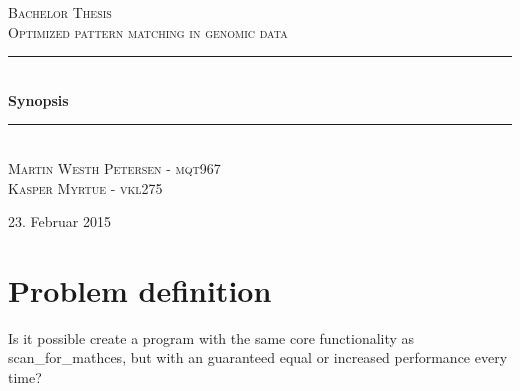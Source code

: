 \documentclass[12pt]{article}
\newcommand{\HRule}{\rule{\linewidth}{0.5mm}}
\begin{document}
\begin{titlepage}
\begin{center}

\textsc{\Large Bachelor Thesis \\ Optimized pattern matching in genomic data\\[0.3cm]}
\HRule \\[0.4cm]
{ \LARGE \bfseries Synopsis}\\[0.4cm]
\HRule \\[1.2cm]
\textsc{\large Martin Westh Petersen - mqt967 \\ Kasper Myrtue - vkl275}\\[1.0cm]
\end{center}
\begin{center}
\vfill
{\large 23. Februar 2015}
\end{center}
\end{titlepage}
\section{Problem definition}
Is it possible create a program with the same core functionality as scan\_for\_mathces, but with an guaranteed equal or
increased performance every time?
\end{document}
